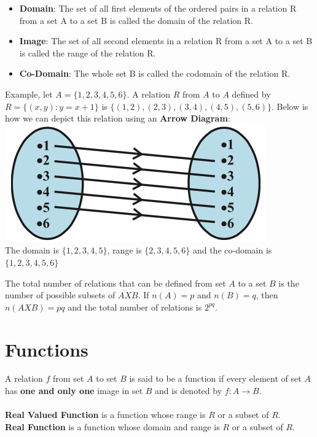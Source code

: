\documentclass{book}
\begin{document}
		\begin{itemize}
			\item \textbf{Domain}: The set of all first elements of the ordered pairs in a relation R from a set A to a set B is called the domain of the relation R.
			\item \textbf{Image}: The set of all second elements in a relation R from a set A to a set B is called the range of the relation R. 
			\item \textbf{Co-Domain}: The whole set B is called the codomain of the relation R.
		\end{itemize}
		
		Example, let $A = \{1,2,3,4,5,6\}$. A relation $R$ from $A$ to $A$ defined by $R = \{(x,y):y=x+1\}$ is $\{(1,2),(2,3),(3,4),(4,5),(5,6)\}$. Below is how we can depict this relation using an \textbf{Arrow Diagram}: \\
		
		\includegraphics[scale=0.6]{relation1} \\
		
		The domain is $\{1,2,3,4,5\}$, range is $\{2,3,4,5,6\}$ and the co-domain is $\{1,2,3,4,5,6\}$

		\begin{mdframed}[backgroundcolor=yellow]
			The total number of relations that can be defined from set $A$ to a set $B$ is the number of possible subsets of $A X B$. If $n(A)=p$ and $n(B)=q$, then $n(AXB)=pq$ and the total number of relations is $2^{pq}$.
		\end{mdframed}
		
		\section{Functions}
		
		A relation $f$ from set $A$ to set $B$ is said to be a function if every element of set $A$ has \textbf{one and only one} image in set $B$ and is denoted by $f: A \rightarrow B$. \\
		\\
		\textbf{Real Valued Function} is a function whose range is $R$ or a subset of $R$. \\
		\textbf{Real Function} is a function whose domain and range  is $R$ or a subset of $R$. \\
\end{document}
